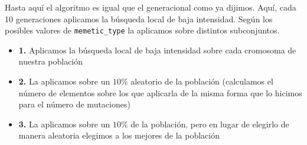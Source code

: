 \documentclass[size=a4, parskip=half, titlepage=false, toc=flat, toc=bib, 12pt]{scrartcl}
\begin{document}
Hasta aquí el algoritmo es igual que el generacional como ya dijimos. Aquí, cada 10 generaciones aplicamos la búsqueda local de baja intensidad. Según los posibles valores de \texttt{memetic\_type} la aplicamos sobre distintos subconjuntos.
\begin{itemize}
    \item \textbf{1.} Aplicamos la búsqueda local de baja intensidad sobre cada cromosoma de nuestra población
    \item \textbf{2.} La aplicamos sobre un $10\%$ aleatorio de la población (calculamos el número de elementos sobre los que aplicarla de la misma forma que lo hicimos para el número de mutaciones)
    \item \textbf{3.} La aplicamos sobre un $10\%$ de la población, pero en lugar de elegirlo de manera aleatoria elegimos a los mejores de la población
\end{itemize}
\end{document}

